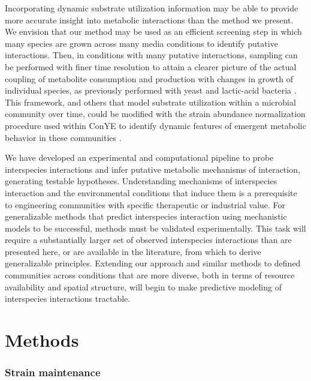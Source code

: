 \documentclass[11pt,onecolumn,notitlepage,openany,twoside]{book}
\begin{document}
\begin{refsection}
Incorporating dynamic substrate utilization information may be able to provide more accurate insight into metabolic interactions than the method we present. We envision that our method may be used as an efficient screening step in which many species are grown across many media conditions to identify putative interactions. Then, in conditions with many putative interactions, sampling can be performed with finer time resolution to attain a clearer picture of the actual coupling of metabolite consumption and production with changes in growth of individual species, as previously performed with yeast and lactic-acid bacteria \cite{Ponomarova2017-ob}. This framework, and others that model substrate utilization within a microbial community over time, could be modified with the strain abundance normalization procedure used within ConYE to identify dynamic features of emergent metabolic behavior in these communities \cite{Erbilgin2017-la}.

We have developed an experimental and computational pipeline to probe interspecies interactions and infer putative metabolic mechanisms of interaction, generating testable hypotheses.  Understanding mechanisms of interspecies interaction and the environmental conditions that induce them is a prerequisite to engineering communities with specific therapeutic or industrial value. For generalizable methods that predict interspecies interaction using mechanistic models to be successful, methods must be validated experimentally. This task will require a substantially larger set of observed interspecies interactions than are presented here, or are available in the literature, from which to derive generalizable principles. Extending our approach and similar methods to defined communities across conditions that are more diverse, both in terms of resource availability and spatial structure, will begin to make predictive modeling of interspecies interactions tractable.

\section{Methods}
\subsubsection{Strain maintenance}


\end{refsection}
\end{document}
